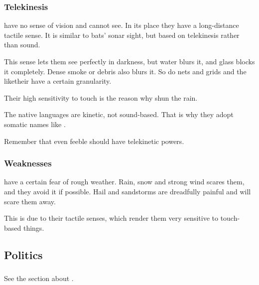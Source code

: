 \subsubsection{Telekinesis}
\Banes{} have no sense of vision and cannot see. 
In its place they have a long-distance tactile sense. 
It is similar to bats' sonar sight, but based on telekinesis rather than sound. 

This sense lets them see perfectly in darkness, but water blurs it, and glass blocks it completely. 
Dense smoke or debris also blurs it. 
So do nets and grids and the like\dash their  have a certain granularity. 

Their high sensitivity to touch is the reason why \banes{} shun the rain. 

The \banes{} native languages are kinetic, not sound-based. 
That is why they adopt somatic names like \quo{\Daggerrain}. 

Remember that even feeble \lesserbanes{} should have telekinetic powers. 





\subsubsection{Weaknesses}
\Banes{} have a certain fear of rough weather. 
Rain, snow and strong wind scares them, and they avoid it if possible. 
Hail and sandstorms are dreadfully painful and will scare them away. 

This is due to their tactile senses, which render them very sensitive to touch-based things. 








\subsection{Politics}





\subsubsection{\Umbrae}
See the section about . 
















